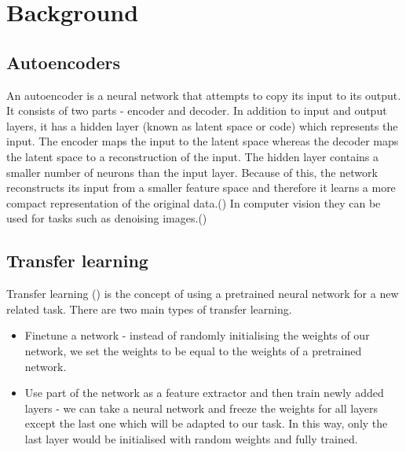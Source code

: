 \documentclass{l4proj}
\begin{document}




\chapter{Background}
\label{chap:background}

\section{Autoencoders}
An autoencoder is a neural network that attempts to copy its input to its output. It consists of two parts - encoder and decoder. In addition to input and output layers, it has a hidden layer (known as latent space or code) which represents the input. The encoder maps the input to the latent space whereas the decoder maps the latent space to a reconstruction of the input. The hidden layer contains a smaller number of neurons than the input layer. Because of this, the network reconstructs its input from a smaller feature space and therefore it learns a more compact representation of the original data.(\cite{deeplearning}) In computer vision they can be used for tasks such as denoising images.(\cite{denoising})


\section{Transfer learning}
Transfer learning (\cite{transfer}) is the concept of using a pretrained neural network for a new related task. There are two main types of transfer learning.
\begin{itemize}
    \item Finetune a network - instead of randomly initialising the weights of our network, we set the weights to be equal to the weights of a pretrained network. 
    \item Use part of the network as a feature extractor and then train newly added layers - we can take a neural network and freeze the weights for all layers except the last one which will be adapted to our task. In this way, only the last layer would be initialised with random weights and fully trained.
\end{itemize}
    
\end{document}
